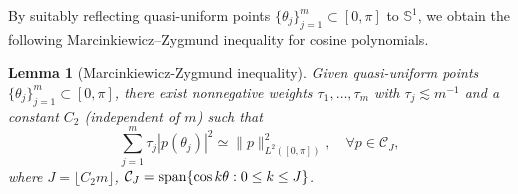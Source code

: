 \documentclass{article}
\numberwithin{equation}{section}
\newtheorem{lemma}{Lemma}
\def\SS{\mathbb{S}}
\begin{document}
By suitably reflecting quasi-uniform points $\{\theta_j\}_{j=1}^m\subset [0,\pi]$ to $\SS^1$, we obtain the following Marcinkiewicz--Zygmund inequality for cosine polynomials.
\begin{lemma}[Marcinkiewicz-Zygmund inequality]\label{lem:MZ-inequ-0-pi}
    Given quasi-uniform points $\{\theta_j\}_{j=1}^m \subset [0,\pi]$, there exist nonnegative weights $\tau_1,\dots,\tau_m$ with $\tau_j\lesssim m^{-1}$ and a constant $C_2$ (independent of $m$) such that
    \begin{equation}\label{eqn:MZ-inequ-0-pi}
        \sum_{j=1}^m\tau_j|p(\theta_j)|^2 \simeq \|p\|_{L^2([0,\pi])}^2, \quad \forall p\in\mathcal{C}_{J},
    \end{equation}
    where $J=\lfloor C_2 m\rfloor$, $\mathcal{C}_{J}={\rm span}\{\cos k\theta:0\leq k\leq J\}$.
\end{lemma}
\end{document}
